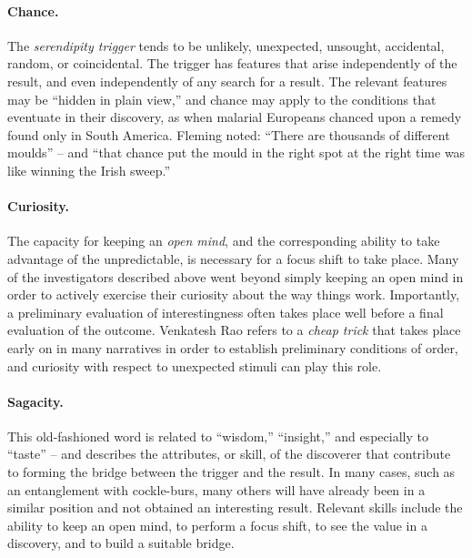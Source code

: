 \paragraph{Chance.}

The {\em serendipity trigger} tends to be unlikely, unexpected,
unsought, accidental, random, or coincidental.  The trigger has
features that arise independently of the result, and even
independently of any search for a result.  The relevant features may
be ``hidden in plain view,'' and chance may apply to the conditions
that eventuate in their discovery, as when malarial Europeans chanced
upon a remedy found only in South America.  Fleming \citeyear{fleming}
noted: ``There are thousands of different moulds'' -- and ``that
chance put the mould in the right spot at the right time was like
winning the Irish sweep.''

\paragraph{Curiosity.}

The capacity for keeping an \emph{open mind}, and the corresponding
ability to take advantage of the unpredictable, is necessary for a
focus shift to take place.  Many of the investigators described above
went beyond simply keeping an open mind in order to actively exercise
their curiosity about the way things work.  Importantly, a preliminary
evaluation of interestingness often takes place well before a final
evaluation of the outcome.  Venkatesh Rao \citeyear{rao2011tempo} refers
to a \emph{cheap trick} that takes place early on in many narratives
in order to establish preliminary conditions of order, and curiosity
with respect to unexpected stimuli can play this role.

\paragraph{Sagacity.}

This old-fashioned word is related to ``wisdom,'' ``insight,'' and
especially to ``taste'' -- and describes the attributes, or skill, of
the discoverer that contribute to forming the bridge between the
trigger and the result.  In many cases, such as an entanglement with
cockle-burs, many others will have already been in a similar position
and not obtained an interesting result.  Relevant skills include the
ability to keep an open mind, to perform a focus shift, to see the
value in a discovery, and to build a suitable bridge.

